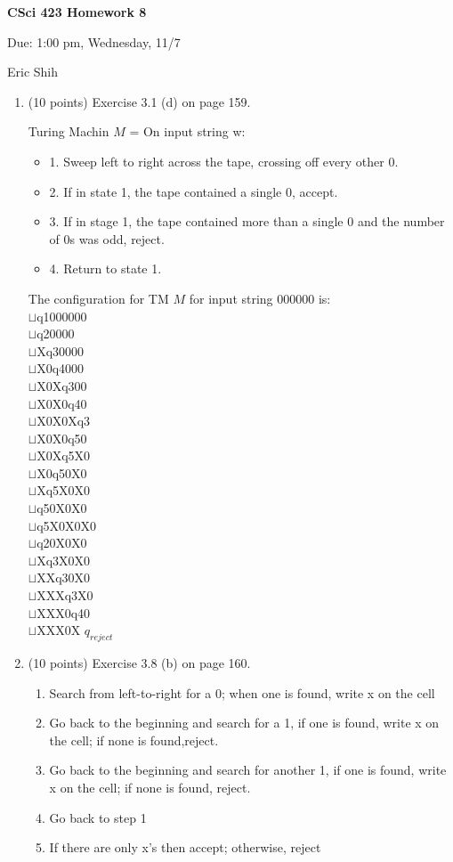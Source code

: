 \documentclass[11pt]{article}
\begin{document}
\begin{LARGE}
\centerline {\bf CSci 423 Homework 8}
\end{LARGE}
\vskip 0.25cm

\centerline{Due: 1:00 pm, Wednesday, 11/7}
\centerline{Eric Shih}

\begin{enumerate}
  \item (10 points) Exercise 3.1 (d) on page 159.
    \begin{center}
     Turing Machin $M$ = On input string w:
     \begin{itemize}
      \item{1.} Sweep left to right across the tape, crossing off every other 0.
      \item{2.} If in state 1, the tape contained a single 0, accept.
      \item{3.} If in stage 1, the tape contained more than a single 0 and the number of 0s was odd, reject.
      \item{4.} Return to state 1.
     \end{itemize}
    \end{center}
    
     The configuration for TM $M$ for input string 000000 is: \\
     $\sqcup$q1000000 \\ $\sqcup$q20000 \\ $\sqcup$Xq30000 \\ $\sqcup$X0q4000 \\ $\sqcup$X0Xq300 \\ $\sqcup$X0X0q40 \\ $\sqcup$X0X0Xq3 \\
     $\sqcup$X0X0q50 \\ $\sqcup$X0Xq5X0 \\ $\sqcup$X0q50X0 \\ $\sqcup$Xq5X0X0 \\ $\sqcup$q50X0X0 \\ $\sqcup$q5X0X0X0 \\ $\sqcup$q20X0X0 \\
     $\sqcup$Xq3X0X0 \\ $\sqcup$XXq30X0 \\ $\sqcup$XXXq3X0 \\ $\sqcup$XXX0q40 \\ $\sqcup$XXX0X $q_{reject}$

  \item (10 points) Exercise 3.8 (b) on page 160.
    \begin{enumerate}
      \item Search from left-to-right for a 0; when one is found, write x on the cell
      \item Go back to the beginning and search for a 1, if one is found, write x on the cell; if none is found,reject.
      \item Go back to the beginning and search for another 1, if one is found, write x on the cell; if none is found, reject.
      \item Go back to step 1
      \item If there are only x’s then accept; otherwise, reject
    \end{enumerate}


\end{enumerate}
\end{document}
